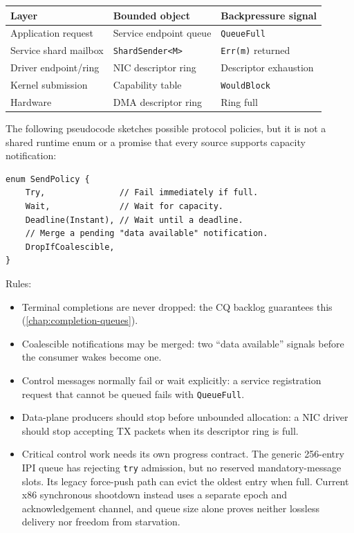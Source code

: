 \begin{center}
\begin{tabular}{|l|l|l|}
\hline
\textbf{Layer} & \textbf{Bounded object} & \textbf{Backpressure signal} \\
\hline
Application request & Service endpoint queue & \texttt{QueueFull} \\
Service shard mailbox & \texttt{ShardSender<M>} & \texttt{Err(m)} returned \\
Driver endpoint/ring & NIC descriptor ring & Descriptor exhaustion \\
Kernel submission & Capability table & \texttt{WouldBlock} \\
Hardware & DMA descriptor ring & Ring full \\
\hline
\end{tabular}
\end{center}

The following pseudocode sketches possible protocol policies, but it is not a shared
runtime enum or a promise that every source supports capacity notification:

\begin{lstlisting}[style=rustCode]
enum SendPolicy {
    Try,               // Fail immediately if full.
    Wait,              // Wait for capacity.
    Deadline(Instant), // Wait until a deadline.
    // Merge a pending "data available" notification.
    DropIfCoalescible,
}
\end{lstlisting}

Rules:

\begin{itemize}
    \item Terminal completions are never dropped: the CQ backlog
        guarantees this (\autoref{chap:completion-queues}).
    \item Coalescible notifications may be merged: two ``data available''
        signals before the consumer wakes become one.
    \item Control messages normally fail or wait explicitly: a service
        registration request that cannot be queued fails with \texttt{QueueFull}.
    \item Data-plane producers should stop before unbounded allocation:
        a NIC driver should stop accepting TX packets when its descriptor ring
        is full.
    \item Critical control work needs its own progress contract. The generic
        256-entry IPI queue has rejecting \texttt{try} admission, but no reserved
        mandatory-message slots. Its legacy force-push path can evict the oldest
        entry when full. Current x86 synchronous shootdown instead uses a separate
        epoch and acknowledgement channel, and queue size alone proves neither lossless
        delivery nor freedom from starvation.
\end{itemize}

